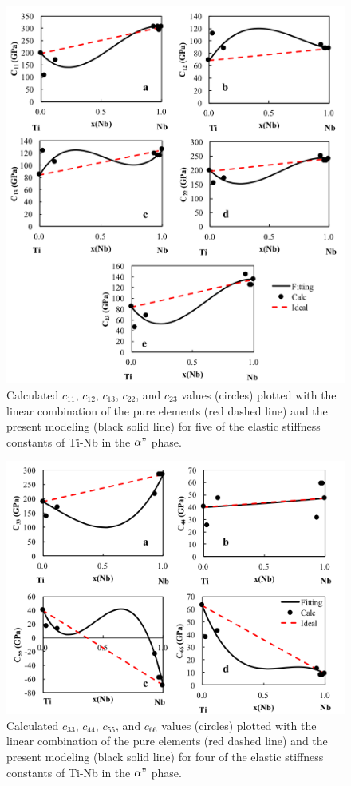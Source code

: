 \pagebreak
\begin{figure}[H]
	\centering
	\includegraphics[width=\textwidth]{Chapter-7/Figures/adpe1.png}
	\caption{Calculated $c_{11}$, $c_{12}$, $c_{13}$, $c_{22}$, and  $c_{23}$ values (circles) plotted with the linear combination of the pure elements (red dashed line) and the present modeling (black solid line) for five of the elastic stiffness constants of Ti-Nb in the $\alpha"$ phase.}
	\label{Ch7-figure:adpelas1}
\end{figure}

\pagebreak
\begin{figure}[H]
	\centering
	\includegraphics[width=\textwidth]{Chapter-7/Figures/adpe2.png}
	\caption{Calculated $c_{33}$, $c_{44}$, $c_{55}$, and $c_{66}$ values (circles) plotted with the linear combination of the pure elements (red dashed line) and the present modeling (black solid line) for four of the elastic stiffness constants of Ti-Nb in the $\alpha"$ phase.}
	\label{Ch7-figure:adpelas2}
\end{figure}

